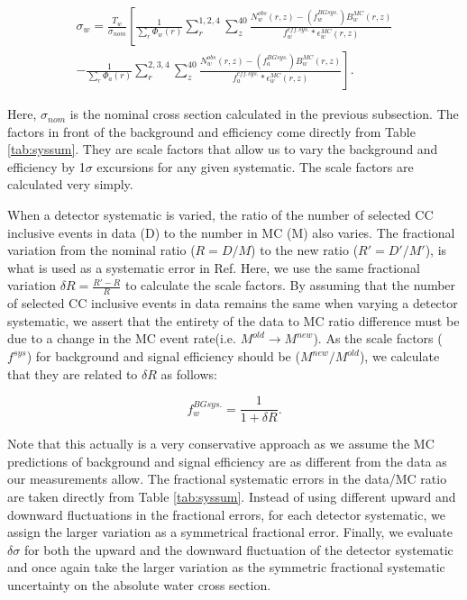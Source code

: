 \begin{multline}
\label{eqn:finalxsec}
\sigma_w = \frac{T_w}{\sigma_{nom}}\left[\frac{1}{\sum\limits_r \Phi_w(r)}\sum\limits_{r}^{1,2,4} \sum\limits_{z}^{40} \frac{N^{obs}_w(r,z)-(f_w^{BG sys.})B^{MC}_w(r,z)}{f_w^{eff. sys.}*\epsilon^{MC}_w(r,z)}
\right. \\
\left. -\frac{1}{\sum\limits_r \Phi_a(r)}\sum\limits_{r}^{2,3,4} \sum\limits_{z}^{40} \frac{N^{obs}_w(r,z)-(f_a^{BG sys.})B^{MC}_w(r,z)}{f_a^{eff. sys.}*\epsilon^{MC}_w(r,z)}\right].
\end{multline}

Here, $\sigma_{nom}$ is the nominal cross section calculated in the previous subsection. The factors in front of the background and efficiency come directly from Table \ref{tab:syssum}. They are scale factors that allow us to vary the background and efficiency by 1$\sigma$ excursions for any given systematic. The scale factors are calculated very simply.

When a detector systematic is varied, the ratio of the number of selected CC inclusive events in data (D) to the number in MC (M) also varies. The fractional variation from the nominal ratio ($R = D / M$) to the new ratio ($R' = D' / M'$), is what is used as a systematic error in Ref\cite{tn80}. Here, we use the same fractional variation $\delta R = \frac{R' - R}{R}$ to calculate the scale factors. By assuming that the number of selected CC inclusive events in data remains the same when varying a detector systematic, we assert that the entirety of the data to MC ratio difference must be due to a change in the MC event rate(i.e. $M^{old} \rightarrow M^{new}$). As the scale factors ($f^{sys}$) for background and signal efficiency should be ($M^{new} / M^{old}$), we calculate that they are related to $\delta R$ as follows:


\begin{equation}
 f^{BG sys.}_w =  \frac{1}{1+\delta R}.
\end{equation}

Note that this actually is a very conservative approach as we assume the MC predictions of background and signal efficiency are as different from the data as our measurements allow. The fractional systematic errors in the data/MC ratio are taken directly from Table \ref{tab:syssum}. Instead of using different upward and downward fluctuations in the fractional errors, for each detector systematic, we assign the larger variation as a symmetrical fractional error. Finally, we evaluate $\delta\sigma$ for both the upward and the downward fluctuation of the detector systematic and once again take the larger variation as the symmetric fractional systematic uncertainty on the absolute water cross section.

